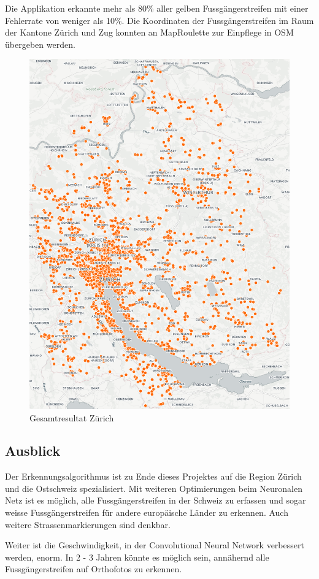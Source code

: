 Die Applikation erkannte mehr als 80\% aller gelben Fussgängerstreifen mit einer Fehlerrate von weniger als 10\%. Die Koordinaten der Fussgängerstreifen im Raum der Kantone Zürich und Zug konnten an MapRoulette zur Einpflege in OSM übergeben werden.
\\
\begin{figure}[H]
	\centering
	\includegraphics[width=\textwidth -80mm]{images/karte.png}
	\caption{Gesamtresultat Zürich}
\end{figure}

\subsection*{Ausblick}
Der Erkennungsalgorithmus ist zu Ende dieses Projektes auf die Region Zürich und die Ostschweiz spezialisiert. Mit weiteren Optimierungen beim Neuronalen Netz ist es möglich, alle Fussgängerstreifen in der Schweiz zu erfassen und sogar weisse Fussgängerstreifen für andere europäische Länder zu erkennen. Auch weitere Strassenmarkierungen sind denkbar.

Weiter ist die Geschwindigkeit, in der Convolutional Neural Network verbessert werden, enorm. In 2 - 3 Jahren könnte es möglich sein, annähernd alle Fussgängerstreifen auf Orthofotos zu erkennen.
\newpage